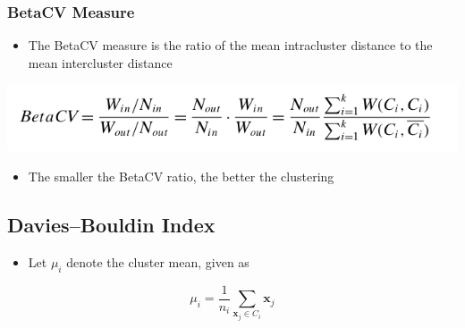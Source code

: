 \documentclass[11pt]{article}
\begin{document}
\subsubsection{BetaCV Measure}
\label{sec:org795a2b8}
\begin{itemize}
\item The BetaCV measure is the ratio of the mean intracluster distance to the mean intercluster distance
\end{itemize}
\begin{center}
\includegraphics[width=.9\linewidth]{Clustering Validation/screenshot_2018-11-27_23-20-50.png}
\end{center}
\begin{itemize}
\item The smaller the BetaCV ratio, the better the clustering
\end{itemize}

\subsection{Davies–Bouldin Index}
\label{sec:orge1ac68c}
\begin{itemize}
\item Let \(\mu_i\) denote the cluster mean, given as
\end{itemize}
\begin{equation}
  \mu_i = \frac1{n_i} \sum_{\pmb x_j \in C_i} \pmb x_j
\end{equation}
\end{document}
